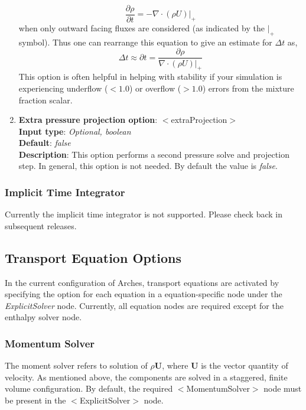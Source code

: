 \begin{enumerate}
\[
\frac{\partial \rho}{\partial t} = -\nabla \cdot (\rho U)|_{+}
\]
when only outward facing fluxes are considered (as indicated by the $|_+$ symbol).  Thus one can rearrange this equation to give an estimate for $\Delta t$ as, 
\[ 
\Delta t \approx \partial t =  \frac{\partial \rho}{  \nabla \cdot (\rho U)|_{+}}
\] 
This option is often helpful in helping with stability if your simulation is experiencing underflow ($<1.0$) or overflow ($>1.0$) errors from the mixture fraction scalar.  
%
\item {\bf Extra pressure projection option}: $<$extraProjection$>$ \\
{\bf Input type}: {\it Optional, boolean} \\
{\bf Default}: {\it false}   \\ 
{\bf Description}: This option performs a second pressure solve and projection step.  In general, this option is not needed. By default the value is {\it false}.   
 \end{enumerate}

\subsubsection{Implicit Time Integrator}
%
Currently the implicit time integrator is not supported. Please check back in subsequent releases.

\subsection{Transport Equation Options}\label{Sec:Eqns_options}
In the current configuration of Arches, transport equations are activated by specifying the option for each equation in a equation-specific node under the {\it ExplicitSolver} node.  Currently, all equation nodes are required except for the enthalpy solver node.  

\subsubsection{Momentum Solver}
The moment solver refers to solution of $\rho \mathbf{U}$, where $\mathbf{U}$ is the vector quantity of velocity.  As mentioned above, the components are solved in a staggered, finite volume configuration. By default, the required $<$MomentumSolver$>$ node must be present in the $<$ExplicitSolver$>$ node.   

